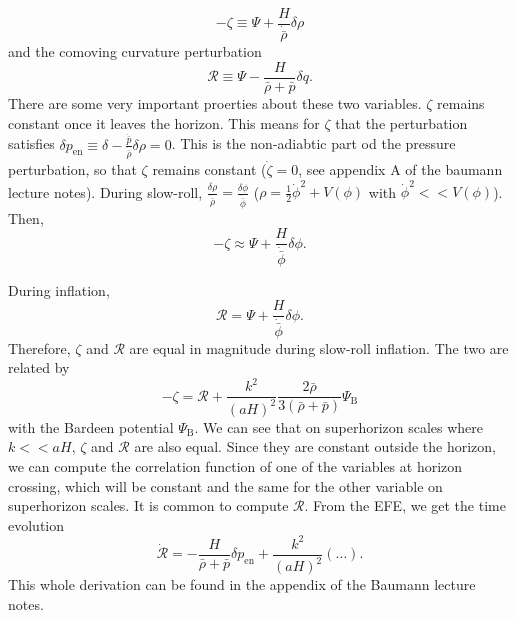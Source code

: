 \documentclass[12pt]{article}
\begin{document}
\begin{equation}
    -\zeta \equiv \Psi + \frac{H}{\dot{\bar{\rho}}} \delta \rho
\end{equation}
and the comoving curvature perturbation
\begin{equation}
    \mathcal{R} \equiv \Psi - \frac{H}{\bar{\rho} + \bar{p}} \delta q.
\end{equation}
There are some very important proerties about these two variables. $\zeta$ remains constant once it leaves the horizon. This means for $\zeta$ that the perturbation satisfies $\delta p_{\mathrm{en}} \equiv \delta - \frac{\dot{\bar{p}}}{\dot{\bar{\rho}}}\delta \rho = 0$. This is the non-adiabtic part od the pressure perturbation, so that $\zeta$ remains constant ($\dot{\zeta}=0$, see appendix A of the baumann lecture notes). During slow-roll, $\frac{\delta \rho}{\dot{\bar{\rho}}} = \frac{\delta \phi}{\dot{\bar{\phi}}}$ ($\rho = \frac{1}{2} \dot{\phi}^2 + V(\phi)$ with  $\dot{\phi}^2 << V(\phi)$). Then, 
\begin{equation}
    - \zeta \approx \Psi + \frac{H}{\dot{\bar{\phi}}} \delta \phi.
\end{equation}

During inflation, 
\begin{equation}
    \mathcal{R} = \Psi + \frac{H}{\dot{\bar{\phi}}} \delta \phi.
\end{equation}
Therefore, $\zeta$ and $\mathcal{R}$ are equal in magnitude during slow-roll inflation. The two are related by 
\begin{equation}
    -\zeta = \mathcal{R} + \frac{k^2}{(aH)^2} \frac{2 \bar{\rho}}{3(\bar{\rho} + \bar{p})} \Psi_{\mathrm{B}}
\end{equation}
with the Bardeen potential $\Psi_{\mathrm{B}}$. We can see that on superhorizon scales where $k << aH$, $\zeta$ and $\mathcal{R}$ are also equal. Since they are constant outside the horizon, we can compute the correlation function of one of the variables at horizon crossing, which will be constant and the same for the other variable on superhorizon scales. It is common to compute $\mathcal{R}$. From the EFE, we get the time evolution
\begin{equation}
    \dot{\mathcal{R}} = -\frac{H}{\bar{\rho} + \bar{p}}\delta p_{\mathrm{en}} + \frac{k^2}{(aH)^2}\left(\dots\right).
\end{equation}
This whole derivation can be found in the appendix of the Baumann lecture notes. 
\end{document}
